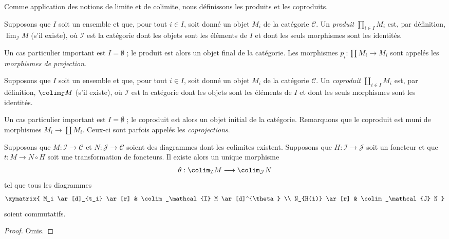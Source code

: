 \noindent
Comme application des notions de limite et de colimite,
nous définissons les produits et les coproduits.

\begin{definition}
\label{definition-product}
Supposons que $I$ soit un ensemble et que, pour tout $i \in I$, soit donné
un objet $M_i$ de la catégorie $\mathcal{C}$. Un {\it produit}
$\prod_{i\in I} M_i$ est, par définition, $\lim_\mathcal{I} M$
(s'il existe), où $\mathcal{I}$ est la catégorie dont les objets
sont les éléments de $I$ et dont les seuls morphismes sont les identités.
\end{definition}

\noindent
Un cas particulier important est $I = \emptyset$ ; le
produit est alors un objet final de la catégorie.
Les morphismes $p_i : \prod M_i \to M_i$ sont appelés les
{\it morphismes de projection}.

\begin{definition}
\label{definition-coproduct}
Supposons que $I$ soit un ensemble et que, pour tout $i \in I$, soit donné
un objet $M_i$ de la catégorie $\mathcal{C}$. Un {\it coproduit}
$\coprod_{i\in I} M_i$ est, par définition, $\colim_\mathcal{I} M$
(s'il existe), où $\mathcal{I}$ est la catégorie dont les objets
sont les éléments de $I$ et dont les seuls morphismes sont les identités.
\end{definition}

\noindent
Un cas particulier important est $I = \emptyset$ ; le
coproduit est alors un objet initial de la catégorie.
Remarquons que le coproduit est muni de morphismes
$M_i \to \coprod M_i$. Ceux-ci sont parfois appelés les
{\it coprojections}.

\begin{lemma}
\label{lemma-functorial-colimit}
Supposons que $M : \mathcal{I} \to \mathcal{C}$
et $N : \mathcal{J} \to \mathcal{C}$ soient des diagrammes
dont les colimites existent. Supposons que
$H : \mathcal{I} \to \mathcal{J}$ soit
un foncteur et que $t : M \to N \circ H$
soit une transformation de foncteurs.
Il existe alors un unique morphisme
$$
\theta :
\colim_\mathcal{I} M
\longrightarrow
\colim_\mathcal{J} N
$$
tel que tous les diagrammes
$$
\xymatrix{
M_i \ar[d]_{t_i} \ar[r]
&
\colim_\mathcal{I} M \ar[d]^{\theta}
\\
N_{H(i)} \ar[r]
&
\colim_\mathcal{J} N
}
$$
soient commutatifs.
\end{lemma}

\begin{proof}
Omis.
\end{proof}

